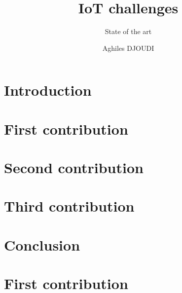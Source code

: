 \documentclass[8pt]{beamer}
\title{IoT challenges}
\subtitle{State of the art}
\author{Aghiles DJOUDI}
\institute{PhD student\\ LIGM/ESIEE Paris \& SIC/ECE Paris}
\begin{document}
\firstpage

\section{Introduction}
	

\tableofcontent

\section{First contribution}
	
	
	
	
	

\section{Second contribution}
		
		
		
		
		

\section{Third contribution}
		
		
		
		
		

\section{Conclusion}
	


\section{First contribution}
	
	
	
	
	




\frameBibliography
\end{document}
